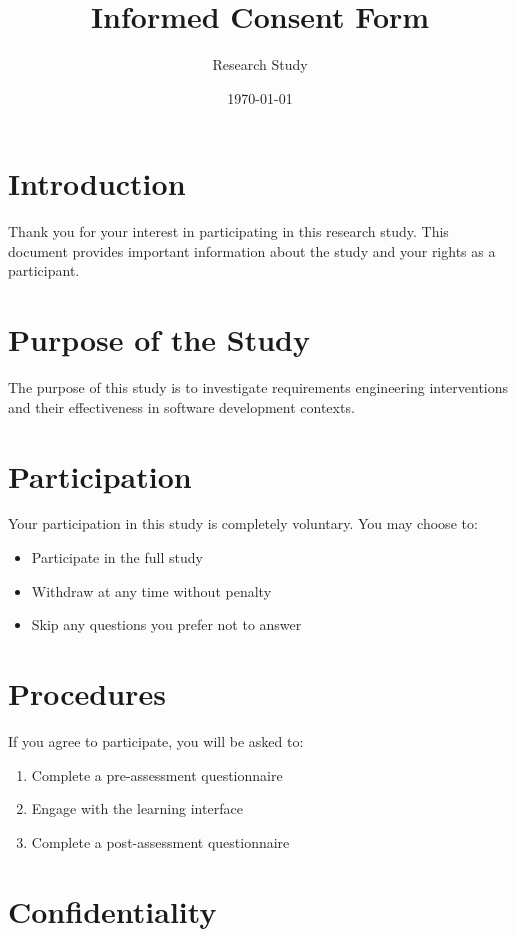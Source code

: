 \documentclass{article}
\title{Informed Consent Form}
\author{Research Study}
\date{\today}
\begin{document}
\maketitle

\section{Introduction}

Thank you for your interest in participating in this research study. This document provides important information about the study and your rights as a participant.

\section{Purpose of the Study}

The purpose of this study is to investigate requirements engineering interventions and their effectiveness in software development contexts.

\section{Participation}

Your participation in this study is completely voluntary. You may choose to:

\begin{itemize}
    \item Participate in the full study
    \item Withdraw at any time without penalty
    \item Skip any questions you prefer not to answer
\end{itemize}

\section{Procedures}

If you agree to participate, you will be asked to:

\begin{enumerate}
    \item Complete a pre-assessment questionnaire
    \item Engage with the learning interface
    \item Complete a post-assessment questionnaire
\end{enumerate}

\section{Confidentiality}
\end{document}
